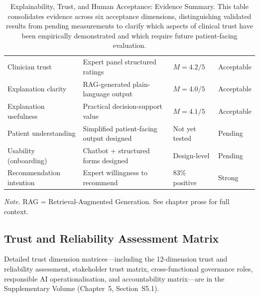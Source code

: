 {\tablestripes\tablefontsize
{}
\begin{xltabular}{\textwidth}{@{} p{3.9cm} p{5.0cm} p{2.6cm} p{2.7cm} @{}}
\caption[Explainability, Trust, and Human Acceptance: Evidence]{Explainability, Trust, and Human Acceptance: Evidence Summary. This table consolidates evidence across six acceptance dimensions, distinguishing validated results from pending measurements to clarify which aspects of clinical trust have been empirically demonstrated and which require future patient-facing evaluation.}\label{tab:trust_acceptance} \\
\toprule
{} &  &  &  \\
\midrule
\endfirsthead
\endhead
\bottomrule
\endlastfoot
Clinician trust & Expert panel structured ratings & $M = 4.2/5$ & Acceptable \\
Explanation clarity & RAG-generated plain-language output & $M = 4.0/5$ & Acceptable \\
Explanation usefulness & Practical decision-support value & $M = 4.1/5$ & Acceptable \\
Patient understanding & Simplified patient-facing output designed & Not yet tested & Pending \\
Usability (onboarding) & Chatbot + structured forms designed & Design-level & Pending \\
Recommendation intention & Expert willingness to recommend & 83\% positive & Strong \\
\end{xltabular}}
\vspace{0.3em}\noindent\textit{Note.} RAG = Retrieval-Augmented Generation. See chapter prose for full context.

\subsection{Trust and Reliability Assessment Matrix}

Detailed trust dimension matrices---including the 12-dimension trust and reliability assessment, stakeholder trust matrix, cross-functional governance roles, responsible AI operationalisation, and accountability matrix---are in the Supplementary Volume (Chapter~5, Section~S5.1).

